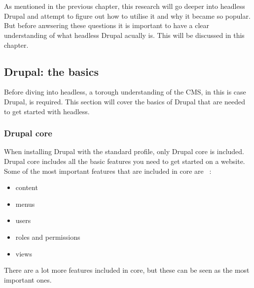 \chapter{}
\label{ch:stand-van-zaken}



As mentioned in the previous chapter, this research will go deeper into headless Drupal and attempt to figure out how to utilise it and why it became so popular. But before anwsering these questions it is important to have a clear understanding of what headless Drupal acually is. This will be discussed in this chapter. 

\section{Drupal: the basics}

Before diving into headless, a torough understanding of the CMS, in this is case Drupal, is required. This section will cover the basics of Drupal that are needed to get started with headless.


\subsection{Drupal core}

When installing Drupal with the standard profile, only Drupal core is included. Drupal core includes all the basic features you need to get started on a website. Some of the most important features that are included in core are ~\autocite{Tomlinson2015}: 

\begin{itemize}
	\item  content
	\item  menus
	\item  users
	\item  roles and permissions
	\item  views
\end{itemize}
There are a lot more features included in core, but these can be seen as the most important ones.

